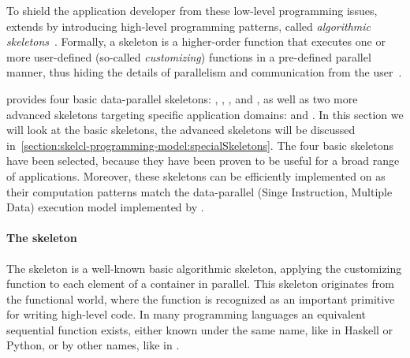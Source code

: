 To shield the application developer from these low-level programming issues, \SkelCL extends \OpenCL by introducing high-level programming patterns, called \emph{algorithmic skeletons}~\cite{Cole1991}.
Formally, a skeleton is a higher-order function that executes one or more user-defined (so-called \emph{customizing}) functions in a pre-defined parallel manner, thus hiding the details of parallelism and communication from the user~\cite{GorlatchCo2011}.

\SkelCL provides four basic data-parallel skeletons: \map, \zip, \reduce, and \scan,
as well as two more advanced skeletons targeting specific application domains: \stencil and \allpairs.
In this section we will look at the basic skeletons, the advanced skeletons will be discussed in~\autoref{section:skelcl-programming-model:specialSkeletons}.
The four basic skeletons have been selected, because they have been proven to be useful for a broad range of applications.
Moreover, these skeletons can be efficiently implemented on \GPUs as their computation patterns match the data-parallel \SIMD (Singe Instruction, Multiple Data) execution model implemented by \GPUs.


\paragraph{The \map skeleton}
The \map skeleton is a well-known basic algorithmic skeleton, applying the customizing function to each element of a container in parallel.
This skeleton originates from the functional world, where the  function is recognized as an important primitive for writing high-level code.
In many programming languages an equivalent sequential function exists, either known under the same name, like in Haskell or Python, or by other names, like  in \Cpp.


